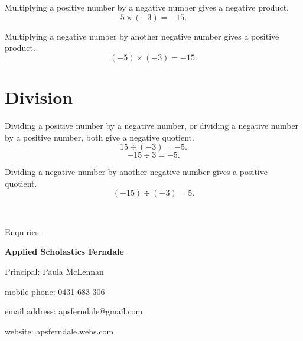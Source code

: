 \documentclass{article}
\begin{document}
Multiplying a positive number by a negative number gives a negative product.
$$5\times(-3)=-15.$$

Multiplying a negative number by another negative number gives a positive product.
$$(-5)\times(-3)=-15.$$

\section*{Division}

Dividing a positive number by a negative number, or dividing a negative number by a positive number, both give a negative quotient.
$$15\div(-3)=-5.$$
$$-15\div3=-5.$$

Dividing a negative number by another negative number gives a positive quotient.
$$(-15)\div(-3)=5.$$

\newpage
\
\newpage
\

\begin{center}
\linespread{2}\large

Enquiries

\textbf{Applied Scholastics Ferndale}

Principal: Paula McLennan

mobile phone: 0431 683 306

email address: apsferndale@gmail.com

website: apsferndale.webs.com
\end{center}
\end{document}
